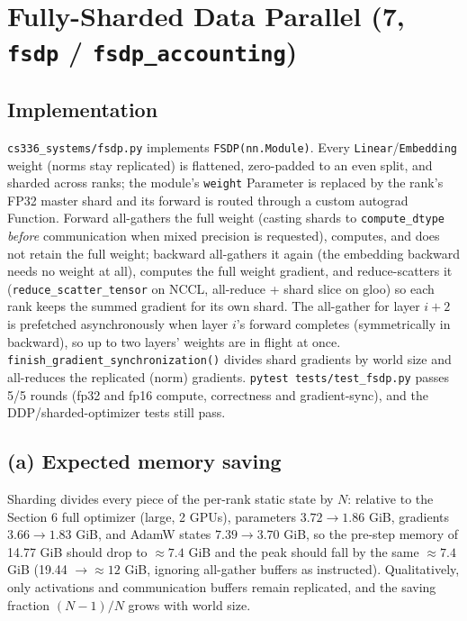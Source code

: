 \documentclass[11pt]{article}
\newcommand{\code}[1]{\texttt{#1}}
\begin{document}
\section{Fully-Sharded Data Parallel (7, \texttt{fsdp} / \texttt{fsdp\_accounting})}

\subsection{Implementation}

\code{cs336\_systems/fsdp.py} implements \code{FSDP(nn.Module)}. Every \code{Linear}/\code{Embedding}
weight (norms stay replicated) is flattened, zero-padded to an even split, and sharded across
ranks; the module's \code{weight} Parameter is replaced by the rank's FP32 master shard and its
forward is routed through a custom autograd Function. Forward all-gathers the full weight (casting
shards to \code{compute\_dtype} \emph{before} communication when mixed precision is requested),
computes, and does not retain the full weight; backward all-gathers it again (the embedding
backward needs no weight at all), computes the full weight gradient, and reduce-scatters it
(\code{reduce\_scatter\_tensor} on NCCL, all-reduce + shard slice on gloo) so each rank keeps the
summed gradient for its own shard. The all-gather for layer $i{+}2$ is prefetched asynchronously
when layer $i$'s forward completes (symmetrically in backward), so up to two layers' weights are in
flight at once. \code{finish\_gradient\_synchronization()} divides shard gradients by world size and
all-reduces the replicated (norm) gradients. \code{pytest tests/test\_fsdp.py} passes 5/5 rounds
(fp32 and fp16 compute, correctness and gradient-sync), and the DDP/sharded-optimizer tests still
pass.

\subsection{(a) Expected memory saving}

Sharding divides every piece of the per-rank static state by $N$: relative to the Section 6 full
optimizer (large, 2 GPUs), parameters $3.72 \to 1.86$ GiB, gradients $3.66 \to 1.83$ GiB, and AdamW
states $7.39 \to 3.70$ GiB, so the pre-step memory of 14.77 GiB should drop to ${\approx}7.4$ GiB
and the peak should fall by the same ${\approx}7.4$ GiB (19.44 $\to {\approx}12$ GiB, ignoring
all-gather buffers as instructed). Qualitatively, only activations and communication buffers remain
replicated, and the saving fraction $(N{-}1)/N$ grows with world size.
\end{document}
